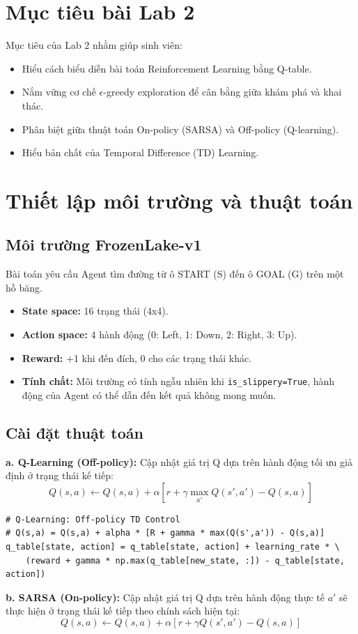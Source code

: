 \section{Mục tiêu bài Lab 2}
Mục tiêu của Lab 2 nhằm giúp sinh viên:
\begin{itemize}
    \item Hiểu cách biểu diễn bài toán Reinforcement Learning bằng Q-table.
    \item Nắm vững cơ chế $\epsilon$-greedy exploration để cân bằng giữa khám phá và khai thác.
    \item Phân biệt giữa thuật toán On-policy (SARSA) và Off-policy (Q-learning).
    \item Hiểu bản chất của Temporal Difference (TD) Learning.
\end{itemize}

\section{Thiết lập môi trường và thuật toán}
\subsection{Môi trường FrozenLake-v1}
Bài toán yêu cầu Agent tìm đường từ ô START (S) đến ô GOAL (G) trên một hồ băng.
\begin{itemize}
    \item \textbf{State space:} 16 trạng thái (4x4).
    \item \textbf{Action space:} 4 hành động (0: Left, 1: Down, 2: Right, 3: Up).
    \item \textbf{Reward:} +1 khi đến đích, 0 cho các trạng thái khác.
    \item \textbf{Tính chất:} Môi trường có tính ngẫu nhiên khi \texttt{is\_slippery=True}, hành động của Agent có thể dẫn đến kết quả không mong muốn.
\end{itemize}

\subsection{Cài đặt thuật toán}
\textbf{a. Q-Learning (Off-policy):}
Cập nhật giá trị Q dựa trên hành động tối ưu giả định ở trạng thái kế tiếp:
\begin{equation}
    Q(s, a) \leftarrow Q(s, a) + \alpha [r + \gamma \max_{a'} Q(s', a') - Q(s, a)]
\end{equation}

\begin{lstlisting}[style=PythonStyle, caption={Q-Learning Update Implementation}]
# Q-Learning: Off-policy TD Control
# Q(s,a) = Q(s,a) + alpha * [R + gamma * max(Q(s',a')) - Q(s,a)]
q_table[state, action] = q_table[state, action] + learning_rate * \
    (reward + gamma * np.max(q_table[new_state, :]) - q_table[state, action])
\end{lstlisting}
\textbf{b. SARSA (On-policy):}
Cập nhật giá trị Q dựa trên hành động thực tế $a'$ sẽ thực hiện ở trạng thái kế tiếp theo chính sách hiện tại:
\begin{equation}
    Q(s, a) \leftarrow Q(s, a) + \alpha [r + \gamma Q(s', a') - Q(s, a)]
\end{equation}

